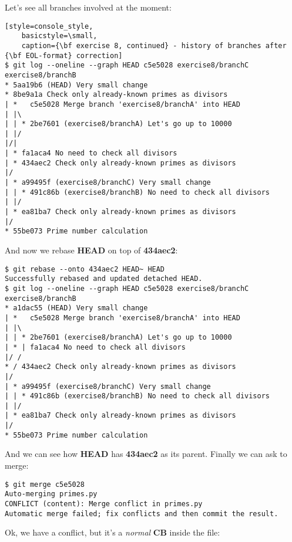 Let's see all branches involved at the moment:

\begin{lstlisting}[style=console_style,
	basicstyle=\small,
	caption={\bf exercise 8, continued} - history of branches after {\bf EOL-format} correction]
$ git log --oneline --graph HEAD c5e5028 exercise8/branchC exercise8/branchB
* 5aa19b6 (HEAD) Very small change
* 8be9a1a Check only already-known primes as divisors
| *   c5e5028 Merge branch 'exercise8/branchA' into HEAD
| |\  
| | * 2be7601 (exercise8/branchA) Let's go up to 10000
| |/  
|/|   
| * fa1aca4 No need to check all divisors
| * 434aec2 Check only already-known primes as divisors
|/  
| * a99495f (exercise8/branchC) Very small change
| | * 491c86b (exercise8/branchB) No need to check all divisors
| |/  
| * ea81ba7 Check only already-known primes as divisors
|/  
* 55be073 Prime number calculation
\end{lstlisting}

And now we rebase {\bf HEAD} on top of {\bf 434aec2}:

\begin{lstlisting}[style=console_style,
	basicstyle=\small,
	caption={\bf exercise 8, continued} - rebasing]
$ git rebase --onto 434aec2 HEAD~ HEAD
Successfully rebased and updated detached HEAD.
$ git log --oneline --graph HEAD c5e5028 exercise8/branchC exercise8/branchB
* a1dac55 (HEAD) Very small change
| *   c5e5028 Merge branch 'exercise8/branchA' into HEAD
| |\  
| | * 2be7601 (exercise8/branchA) Let's go up to 10000
| * | fa1aca4 No need to check all divisors
|/ /  
* / 434aec2 Check only already-known primes as divisors
|/  
| * a99495f (exercise8/branchC) Very small change
| | * 491c86b (exercise8/branchB) No need to check all divisors
| |/  
| * ea81ba7 Check only already-known primes as divisors
|/  
* 55be073 Prime number calculation
\end{lstlisting}

And we can see how {\bf HEAD} has {\bf 434aec2} as its parent. Finally we can ask to merge:

\begin{lstlisting}[style=console_style,
	basicstyle=\small,
	caption={\bf exercise 8, continued} - trying real merge]
$ git merge c5e5028
Auto-merging primes.py
CONFLICT (content): Merge conflict in primes.py
Automatic merge failed; fix conflicts and then commit the result.
\end{lstlisting}

Ok, we have a conflict, but it's a {\it normal} {\bf CB} inside the file:

